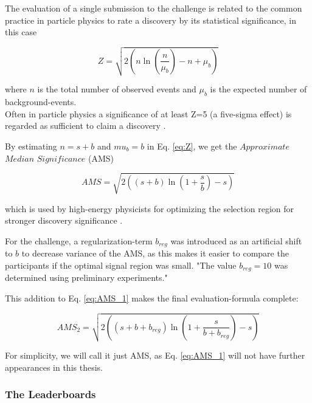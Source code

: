 The evaluation of a single submission to the challenge is related to the common practice in particle physics to rate a discovery by its statistical significance, in this case 


\begin{equation}\label{eq:Z}
	Z = \sqrt{2 \left(n \ln{\left( \frac{n}{\mu_b} \right)} -
	n + \mu_b \right)}
\end{equation}

where $n$ is the total number of observed events and $\mu_b$ is the expected number of background-events.\\
Often in particle physics a significance of at least Z=5 (a five-sigma effect) is regarded as sufficient to claim a discovery \cite{higgsPaper}.

By estimating $n=s+b$ and $mu_b = b$ in Eq. \eqref{eq:Z}, we get the $Approximate$ $Median$ $Significance$ (AMS)

\begin{equation}\label{eq:AMS_1}
	AMS = \sqrt{2 \left( \left( s+b \right) \ln{ \left(1+ \frac{s}
	{b}  \right)} - s \right)}
\end{equation}

which is used by high-energy physicists for optimizing the selection region for stronger discovery significance \cite{higgsPaper}. 

For the challenge, a regularization-term $b_{reg}$ was introduced as an artificial shift to $b$ to decrease variance of the AMS, as this makes it easier to compare the participants if the optimal signal region was small. "The value $b_{reg}=10$ was determined using preliminary experiments." \cite{higgsPaper}

This addition to Eq. \eqref{eq:AMS_1} makes the final evaluation-formula complete:

\begin{equation}\label{eq:AMS_2}
	AMS_2 = \sqrt{2 \left( \left( s+b+b_{reg} \right) \ln{ \left(1+ \frac{s}
	{b+b_{reg}}  \right)} - s \right)}
\end{equation}

For simplicity, we will call it just AMS, as Eq. \eqref{eq:AMS_1} will not have further appearances in this thesis.

\subsubsection{The Leaderboards}

